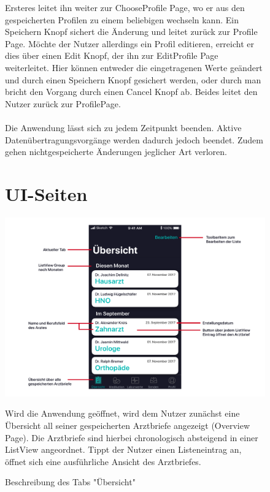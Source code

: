 \documentclass[a4paper]{scrreprt}
\begin{document}
\begin{figure}
Ersteres leitet ihn weiter zur ChooseProfile Page, wo er aus den gespeicherten Profilen zu einem beliebigen wechseln kann. Ein Speichern Knopf sichert die Änderung und leitet zurück zur Profile Page.
Möchte der Nutzer allerdings ein Profil editieren, erreicht er dies über einen Edit Knopf, der ihn zur EditProfile Page weiterleitet. Hier können entweder die eingetragenen Werte geändert und durch einen Speichern Knopf gesichert werden, oder durch man bricht den Vorgang durch einen Cancel Knopf ab. Beides leitet den Nutzer zurück zur ProfilePage.
\\
\\
Die Anwendung lässt sich zu jedem Zeitpunkt beenden. Aktive Datenübertragungsvorgänge werden dadurch jedoch beendet. Zudem gehen nichtgespeicherte Änderungen jeglicher Art verloren.
\end{figure}

\begin{figure}
\section{UI-Seiten}

\includegraphics[width=1\textwidth]{graphics/UIDescriptions/OverviewDesc}
\caption{Beschreibung des Tabs "Übersicht"}
\vspace{0.5cm}
Wird die Anwendung geöffnet, wird dem Nutzer zunächst eine Übersicht all seiner gespeicherten Arztbriefe angezeigt (Overview Page). Die Arztbriefe sind hierbei chronologisch absteigend in einer ListView angeordnet. Tippt der Nutzer einen Listeneintrag an, öffnet sich eine ausführliche Ansicht des Arztbriefes.
\end{figure}
\end{document}
